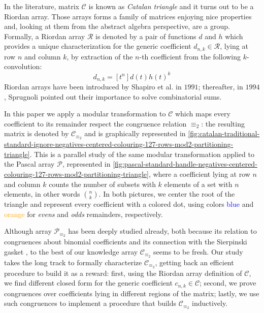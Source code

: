 In the literature, matrix $\mathcal{C}$ is known as \emph{Catalan triangle} and
it turns out to be a Riordan array. Those arrays forms a family of matrices enjoying
nice properties and, looking at them from the abstract algebra perspective, are a group. 
Formally, a Riordan array $\mathcal{R}$ is denoted by a pair of functions $d$ and $h$ which provides a unique 
characterization for the generic coefficient $d_{n,k}\in\mathcal{R}$, lying at row $n$ and column $k$, 
by extraction of the $n$-th coefficient from the following $k$-convolution:
\begin{equation}
    d_{n,k} = [t^{n}]d(t)h(t)^{k}
    \label{eq:Riordan:array:coefficient}
\end{equation}
Riordan arrays have been introduced by Shapiro et al. \cite{shapiro:1991} in $1991$;
thereafter, in $1994$, Sprugnoli \cite{sprugnoli:1991} pointed out their importance
to solve combinatorial sums.

In this paper we apply a modular transformation to $\mathcal{C}$ which maps every coefficient 
to its remainder respect the congruence relation $\equiv_{2}$: the resulting matrix is 
denoted by $\mathcal{C}_{\equiv_{2}}$ and is graphically represented in 
\autoref{fig:catalan-traditional-standard-ignore-negatives-centered-colouring-127-rows-mod2-partitioning-triangle}.
This is a parallel study of the same modular transformation applied to the Pascal array $\mathcal{P}$,
represented in \autoref{fig:pascal-standard-handle-negatives-centered-colouring-127-rows-mod2-partitioning-triangle},
where a coefficient lying at row $n$ and column $k$ counts the number of subsets
with $k$ elements of a set with $n$ elements, in other words ${{n}\choose{k}}$.
In both pictures, we center the root of the triangle and represent every coefficient 
with a colored dot, using colors \textcolor{blue}{blue} and \textcolor{orange}{orange} 
for \emph{evens} and \emph{odds} remainders, respectively. 

Although array $\mathcal{P}_{\equiv_{2}}$ has been deeply studied already, both because its 
relation to congruences about binomial coefficients and its connection with
the Sierpinski gasket \cite{stewart:four:encounters:sierpinski} \cite{sokolov},
to the best of our knowledge array $\mathcal{C}_{\equiv_{2}}$ seems to be fresh.  
Our study takes the long track to formally characterize $\mathcal{C}_{\equiv_{2}}$,
getting back an efficient procedure to build it as a reward: first,
using the Riordan array definition of $\mathcal{C}$, we find different closed form for
the generic coefficient $c_{n,k}\in\mathcal{C}$; second, we prove congruences over coefficients
lying in different regions of the matrix; lastly, we use such congruences to implement a procedure
that builds $\mathcal{C}_{\equiv_{2}}$ inductively. 

